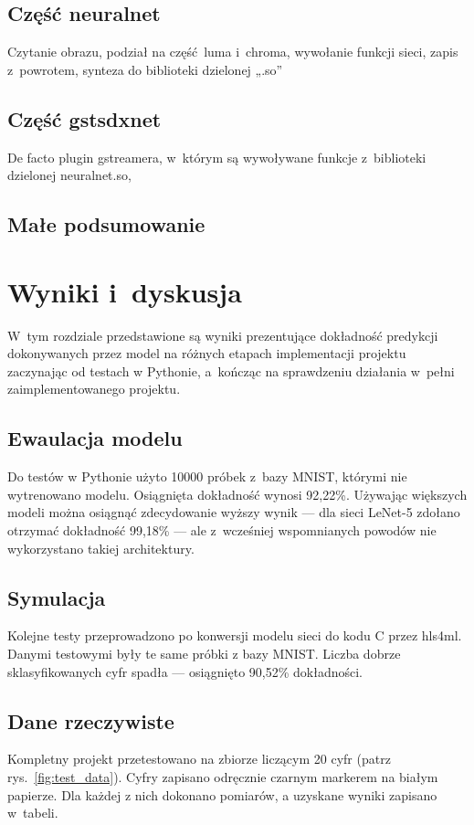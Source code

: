 \documentclass[12pt, oneside, a4paper]{article}
\def\CPP{{C\nolinebreak[4]\hspace{-.05em}\raisebox{.4ex}{\tiny\bf ++}}}
\begin{document}
\subsection{Część neuralnet}
Czytanie obrazu, podział na część luma i~chroma, wywołanie funkcji sieci,
zapis z~powrotem, synteza do biblioteki dzielonej „.so”

\subsection{Część gstsdxnet}
De facto plugin gstreamera, w~którym są wywoływane funkcje z~biblioteki
dzielonej neuralnet.so, 

\subsection{Małe podsumowanie}


\newpage
\section{Wyniki i~dyskusja}
W~tym rozdziale przedstawione są wyniki prezentujące dokładność
predykcji dokonywanych przez model na różnych etapach implementacji
projektu zaczynając od testach w Pythonie, a~kończąc na sprawdzeniu
działania w~pełni zaimplementowanego projektu.

\subsection{Ewaulacja modelu}
Do testów w Pythonie użyto 10000 próbek z~bazy MNIST, którymi nie
wytrenowano modelu. Osiągnięta dokładność wynosi 92,22\%. Używając większych
modeli można osiągnąć zdecydowanie wyższy wynik --- dla sieci \mbox{LeNet-5}
zdołano otrzymać dokładność 99,18\% --- ale z~wcześniej
wspomnianych powodów nie wykorzystano takiej architektury.

\subsection{Symulacja}
Kolejne testy przeprowadzono po konwersji modelu sieci do kodu \CPP{}
przez hls4ml. Danymi testowymi były te same próbki z bazy MNIST.
Liczba dobrze sklasyfikowanych cyfr spadła --- osiągnięto 90,52\%
dokładności.

\subsection{Dane rzeczywiste}
Kompletny projekt przetestowano na zbiorze liczącym 20 cyfr (patrz
rys.~\ref{fig:test_data}). Cyfry
zapisano odręcznie czarnym markerem na białym papierze. Dla każdej z nich
dokonano pomiarów, a uzyskane wyniki zapisano  w~tabeli.
\end{document}
